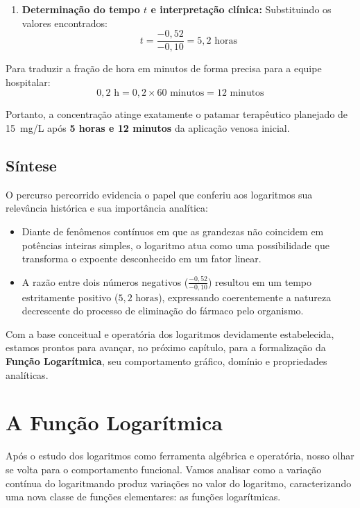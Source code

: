 \documentclass[12pt,a4paper]{report}
\begin{document}
\begin{destaque}
\begin{enumerate}[label=\textbf{\arabic*.}]
			\item \textbf{Determinação do tempo $t$ e interpretação clínica:}  
			Substituindo os valores encontrados:
			$$t = \frac{-0{,}52}{-0{,}10} = 5{,}2\text{ horas}$$
		\end{enumerate}
		
		Para traduzir a fração de hora em minutos de forma precisa para a equipe hospitalar:
		$$0{,}2\text{ h} = 0{,}2 \times 60\text{ minutos} = 12\text{ minutos}$$
		
		Portanto, a concentração atinge exatamente o patamar terapêutico planejado de 15~mg/L após \textbf{5 horas e 12 minutos} da aplicação venosa inicial.
	\end{destaque}
	
	\section*{Síntese}
	
	O percurso percorrido evidencia o papel que conferiu aos logaritmos sua relevância histórica e sua importância analítica:
	\begin{itemize}[label=$\circ$]
		\item Diante de fenômenos contínuos em que as grandezas não coincidem em potências inteiras simples, o logaritmo atua como uma possibilidade que transforma o expoente desconhecido em um fator linear.
		\item A razão entre dois números negativos ($\frac{-0{,}52}{-0{,}10}$) resultou em um tempo estritamente positivo ($5{,}2\text{ horas}$), expressando coerentemente a natureza decrescente do processo de eliminação do fármaco pelo organismo.
	\end{itemize}
	
	Com a base conceitual e operatória dos logaritmos devidamente estabelecida, estamos prontos para avançar, no próximo capítulo, para a formalização da \textbf{Função Logarítmica}, seu comportamento gráfico, domínio e propriedades analíticas.
	
	\chapter{A Função Logarítmica}
	\label{chap:funcao_logaritmica}
	
	Após o estudo dos logaritmos como ferramenta algébrica e operatória, nosso olhar se volta para o comportamento funcional. Vamos analisar como a variação contínua do logaritmando produz variações no valor do logaritmo, caracterizando uma nova classe de funções elementares: as funções logarítmicas.
	
\end{document}
